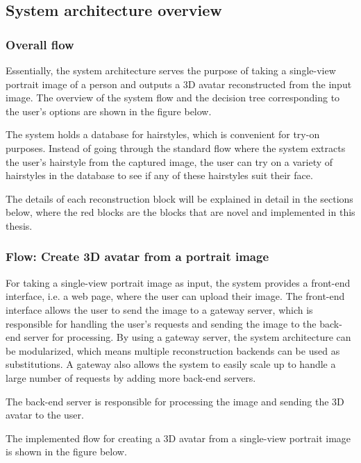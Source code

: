 \subsection{System architecture overview}

\subsubsection{Overall flow}

Essentially, the system architecture serves the purpose of taking a single-view portrait image of a person and outputs a 3D avatar reconstructed from the input image. The overview of the system flow and the decision tree corresponding to the user's options are shown in the figure below.


The system holds a database for hairstyles, which is convenient for try-on purposes. Instead of going through the standard flow where the system extracts the user's hairstyle from the captured image, the user can try on a variety of hairstyles in the database to see if any of these hairstyles suit their face.

The details of each reconstruction block will be explained in detail in the sections below, where the red blocks are the blocks that are novel and implemented in this thesis.

\subsubsection{Flow: Create 3D avatar from a portrait image}
For taking a single-view portrait image as input, the system provides a front-end interface, i.e. a web page, where the user can upload their image. The front-end interface allows the user to send the image to a gateway server, which is responsible for handling the user's requests and sending the image to the back-end server for processing. By using a gateway server, the system architecture can be modularized, which means multiple reconstruction backends can be used as substitutions. A gateway also allows the system to easily scale up to handle a large number of requests by adding more back-end servers.

The back-end server is responsible for processing the image and sending the 3D avatar to the user. 

The implemented flow for creating a 3D avatar from a single-view portrait image is shown in the figure below.



